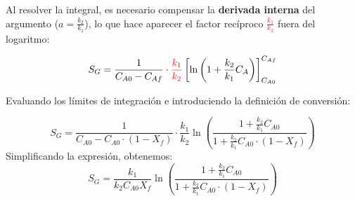 \noindent Al resolver la integral, es necesario compensar la \textbf{derivada interna} del argumento ($a = \frac{k_2}{k_1}$), lo que hace aparecer el factor recíproco \textcolor{red}{$\frac{k_1}{k_2}$} fuera del logaritmo:

\begin{equation}
  S_G = \frac{1}{C_{A0}-C_{Af}} \cdot \textcolor{red}{\frac{k_1}{k_2}} \left[ \ln \left( 1 + \frac{k_2}{k_1} C_A \right) \right]_{C_{A0}}^{C_{Af}}
\end{equation}

\noindent Evaluando los límites de integración e introduciendo la definición de conversión:

\begin{equation}
  S_G = \frac{1}{C_{A0}-C_{A0}\cdot (1-X_f)} \cdot \frac{k_1}{k_2} \ln \left( \frac{1 + \frac{k_2}{k_1}C_{A0}}{1 + \frac{k_2}{k_1}C_{A0}\cdot (1-X_f)} \right)
\end{equation}
\noindent Simplificando la expresión, obtenemos:
\begin{equation}
  S_G = \frac{k_1}{k_2 C_{A0}X_f} \ln \left( \frac{1 + \frac{k_2}{k_1}C_{A0}}{1 + \frac{k_2}{k_1}C_{A0}\cdot (1-X_f)} \right)
\end{equation}

